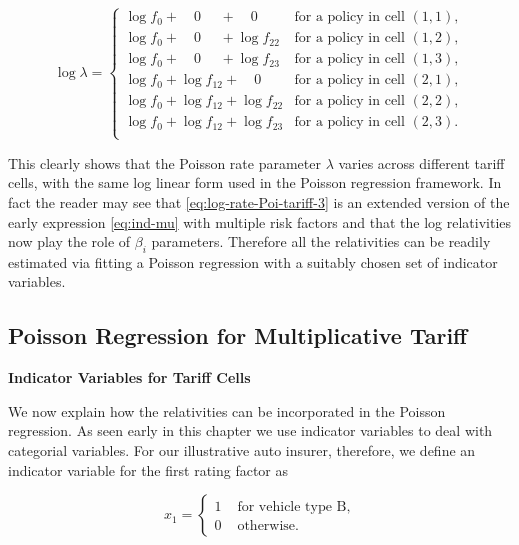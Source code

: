 \documentclass[]{book}
\theoremstyle{definition}
\theoremstyle{definition}
\theoremstyle{definition}
\theoremstyle{remark}
\begin{document}
\begin{equation}
\log \lambda=\begin{cases}
      \log f_0 + \quad 0 \quad \,\,+ \quad 0 \quad \,\,& \text{for a policy in cell $(1,1)$}, \\
            \log f_0+ \quad 0 \quad \,\,+\log f_{22}& \text{for a policy in cell $(1,2)$}, \\
                  \log f_0+ \quad 0 \quad \,\,+\log f_{23}& \text{for a policy in cell $(1,3)$}, \\
                        \log f_0+\log f_{12}+ \quad 0 \quad \,\,& \text{for a policy in cell $(2,1)$}, \\
                              \log f_0+\log f_{12}+\log f_{22}& \text{for a policy in cell $(2,2)$}, \\
                                    \log f_0+\log f_{12}+\log f_{23}& \text{for a policy in cell $(2,3)$}. \\
\end{cases}
\label{eq:log-rate-Poi-tariff-3}
\end{equation}

This clearly shows that the Poisson rate parameter \(\lambda\) varies
across different tariff cells, with the same log linear form used in the
Poisson regression framework. In fact the reader may see that
\eqref{eq:log-rate-Poi-tariff-3} is an extended version of the early
expression \eqref{eq:ind-mu} with multiple risk factors and that the log
relativities now play the role of \(\beta_i\) parameters. Therefore all
the relativities can be readily estimated via fitting a Poisson
regression with a suitably chosen set of indicator variables.

\subsection{Poisson Regression for Multiplicative
Tariff}\label{poisson-regression-for-multiplicative-tariff}

\textbf{Indicator Variables for Tariff Cells}

We now explain how the relativities can be incorporated in the Poisson
regression. As seen early in this chapter we use indicator variables to
deal with categorial variables. For our illustrative auto insurer,
therefore, we define an indicator variable for the first rating factor
as

\begin{equation}
x_1=
\begin{cases}
      1 & \text{ for vehicle type B}, \\
      0 & \text{ otherwise}.
\end{cases}
\end{equation}
\end{document}
